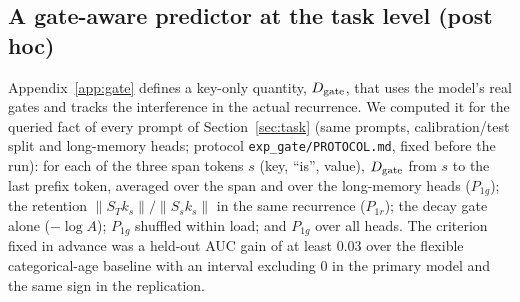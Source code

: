 \subsection{A gate-aware predictor at the task level (post hoc)}\label{app:gatetask}
Appendix~\ref{app:gate} defines a key-only quantity, $D_{\rm gate}$, that uses the model's real gates and tracks the interference in the actual recurrence. We computed it for the queried fact of every prompt of Section~\ref{sec:task} (same prompts, calibration/test split and long-memory heads; protocol \texttt{exp\_gate/PROTOCOL.md}, fixed before the run): for each of the three span tokens $s$ (key, ``is'', value), $D_{\rm gate}$ from $s$ to the last prefix token, averaged over the span and over the long-memory heads ($P_{1g}$); the retention $\|S_Tk_s\|/\|S_sk_s\|$ in the same recurrence ($P_{1r}$); the decay gate alone ($-\log A$); $P_{1g}$ shuffled within load; and $P_{1g}$ over all heads. The criterion fixed in advance was a held-out AUC gain of at least 0.03 over the flexible categorical-age baseline with an interval excluding 0 in the primary model and the same sign in the replication.

\begin{table}[!htbp]
  \caption{Gate-aware key-only predictors of task-level recall (post hoc; 95\% bootstrap intervals). $\Delta$AUC: held-out gain from adding the predictor to age and one-hot load (as pre-registered) or to a fixed effect for every (load, queried position) cell; within-cell $\rho$: rank correlation with the true value's log-probability among the candidates, within exact (load, queried position) cells. Thirty intervals in all, uncorrected.}\label{tab:gatetask}
  \centering\scriptsize\setlength{\tabcolsep}{3pt}
  
\end{table}


